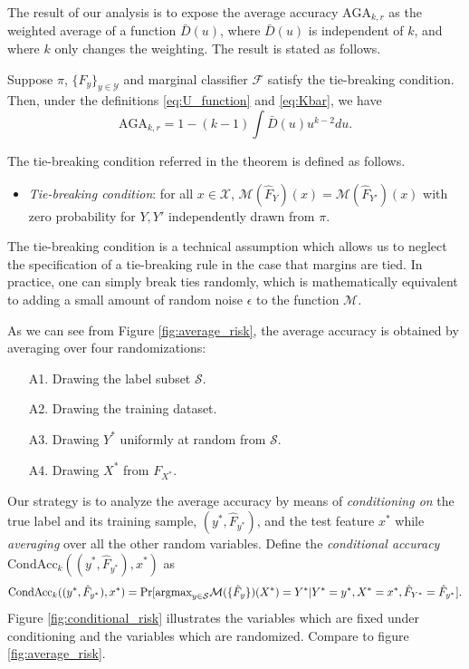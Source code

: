 \documentclass[12pt]{article}
\begin{document}
The result of our analysis is to expose the average accuracy
$\text{AGA}_{k, r}$ as the weighted average of a function
$\bar{D}(u)$, where $\bar{D}(u)$ is independent of $k$, and where $k$
only changes the weighting.  The result is stated as follows.

\begin{theorem}\label{theorem:avrisk_identity}
Suppose $\pi$, $\{F_y\}_{y \in \mathcal{Y}}$ and marginal classifier
$\mathcal{F}$ satisfy the tie-breaking condition.  Then, under the
definitions \eqref{eq:U_function} and \eqref{eq:Kbar}, we have
\begin{equation}\label{eq:avrisk_identity}
\text{AGA}_{k, r} = 1 - (k-1) \int \bar{D}(u) u^{k-2} du.
\end{equation}
\end{theorem}

The tie-breaking condition referred in the theorem is defined as follows.
\begin{itemize}
\item 
\emph{Tie-breaking condition}: for all $x \in \mathcal{X}$,
$\mathcal{M}(\hat{F}_Y)(x) = \mathcal{M}(\hat{F}_{Y'})(x)$
with zero probability for $Y, Y'$ independently drawn from $\pi$.
\end{itemize}
The tie-breaking condition is a technical assumption which allows us
to neglect the specification of a tie-breaking rule in the case that
margins are tied.  In practice, one can simply break ties randomly,
which is mathematically equivalent to adding a small amount of random
noise $\epsilon$ to the function $\mathcal{M}$.

As we can see from Figure \ref{fig:average_risk}, the average accuracy is
obtained by averaging over four randomizations:
\begin{enumerate}
\item[A1.] Drawing the label subset $\mathcal{S}$.
\item[A2.] Drawing the training dataset.
\item[A3.] Drawing $Y^*$ uniformly at random from $\mathcal{S}$.
\item[A4.] Drawing $X^*$ from $F_{X^*}$.
\end{enumerate}


Our strategy is to analyze the average accuracy by
means of \emph{conditioning on} the true label and its training
sample, $(y^*, \hat{F}_{y^*})$, and the test feature $x^*$
while \emph{averaging} over all the other random variables.  Define
the \emph{conditional accuracy} $\text{CondAcc}_k((y^*, \hat{F}_{y^*}), x^*)$ as
\[
\text{CondAcc}_k((y^*, \hat{F}_{y^*}), x^*) = \Pr[\text{argmax}_{y \in \mathcal{S}} \mathcal{M}(\{\hat{F}_y\})(X^*) = Y^* |Y^*=y^*, X^* = x^*, \hat{F}_{Y^*} = \hat{F}_{y^*}].
\]
Figure \ref{fig:conditional_risk} illustrates the variables which are
fixed under conditioning and the variables which are randomized.
Compare to figure \ref{fig:average_risk}.
\end{document}
